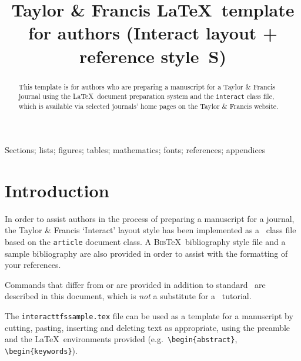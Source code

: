 \documentclass[]{interact}
\theoremstyle{plain}%
\theoremstyle{definition}
\theoremstyle{remark}
\begin{document}

\title{Taylor \& Francis \LaTeX\ template for authors (\textsf{Interact} layout + reference style~S)}

\author{
}

\maketitle

\begin{abstract}
This template is for authors who are preparing a manuscript for a Taylor \& Francis journal using the \LaTeX\ document preparation system and the \texttt{interact} class file, which is available via selected journals' home pages on the Taylor \& Francis website.
\end{abstract}

\begin{keywords}
Sections; lists; figures; tables; mathematics; fonts; references; appendices
\end{keywords}


\section{Introduction}

In order to assist authors in the process of preparing a manuscript for a journal, the Taylor \& Francis `\textsf{Interact}' layout style has been implemented as a \LaTeXe\ class file based on the \texttt{article} document class. A \textsc{Bib}\TeX\ bibliography style file and a sample bibliography are also provided in order to assist with the formatting of your references.

Commands that differ from or are provided in addition to standard \LaTeXe\ are described in this document, which is \emph{not} a substitute for a \LaTeXe\ tutorial.

The \texttt{interacttfssample.tex} file can be used as a template for a manuscript by cutting, pasting, inserting and deleting text as appropriate, using the preamble and the \LaTeX\ environments provided (e.g.\ \verb"\begin{abstract}", \verb"\begin{keywords}").
\end{document}
